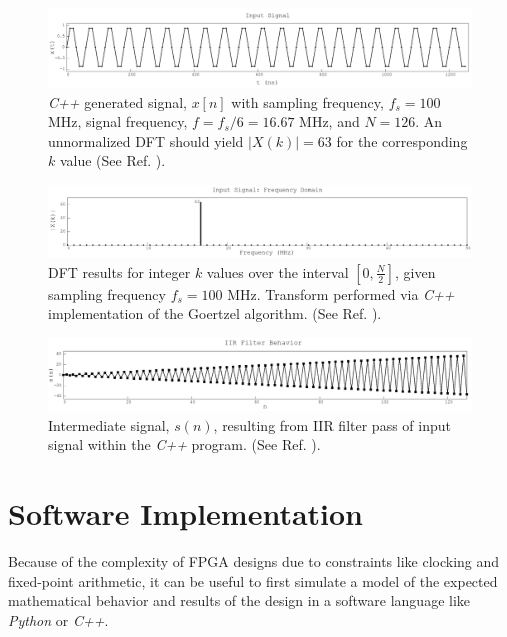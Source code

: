 \documentclass[reprint,amsmath,amssymb,aps,pra]{revtex4-2}
\begin{document}
\begin{figure}
    \centering
    \includegraphics[width=\linewidth]{figs/sine_signal.png}
    \caption{\textit{C++} generated signal, $x[n]$ with sampling frequency, $f_s = 100$ MHz, signal frequency, $f = f_s/6 = 16.67$ MHz, and $N = 126$. An unnormalized DFT should yield $|X(k)| = 63$ for the corresponding $k$ value  (See Ref. \cite{github}).}
    \label{fig:simsignal}
\end{figure}

\begin{figure}
    \centering
    \includegraphics[width=1.01\linewidth]{figs/signal_DFT.png}
        \caption{DFT results for integer $k$ values over the interval $[0,\frac{N}{2}]$, given sampling frequency $f_s = 100$ MHz. Transform performed via \textit{C++} implementation of the Goertzel algorithm. (See Ref. \cite{github}).}
    \label{fig:simoutput}
\end{figure}

\begin{figure}
    \centering
    \includegraphics[width=\linewidth]{figs/probe.png}
    \caption{Intermediate signal, $s(n)$, resulting from IIR filter pass of input signal within the \textit{C++} program. (See Ref. \cite{github}).}
    \label{fig:intermediate}
\end{figure}

\section{Software Implementation}

Because of the complexity of FPGA designs due to constraints like clocking and fixed-point arithmetic, it can be useful to first simulate a model of the expected mathematical behavior and results of the design in a software language like \textit{Python} or \textit{C++}. 
\end{document}
